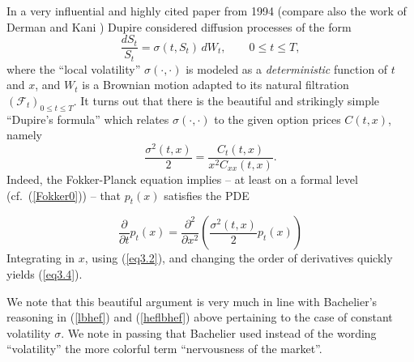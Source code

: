 \documentclass[11pt,a4paper]{article}%
\numberwithin{equation}{section}
\begin{document}
In a very influential and highly cited paper from 1994 \cite{Du94} (compare also the work of Derman and Kani \cite{DeKa94}) Dupire  considered diffusion processes of the form 
\begin{equation}\label{eq3.3}
\frac{dS_t}{S_t}=\sigma(t,S_t)\, dW_t,\qquad 0\le t \le T,
\end{equation}
where the ``local volatility'' $\sigma(\cdot,\cdot)$ is modeled as a {\it deterministic} function  of $t$ and $x$, and $W_t$ is a Brownian motion adapted to its natural filtration $(\mathcal F_t)_{0 \le t \le T }$. It turns out that there is the beautiful and strikingly simple ``Dupire's formula'' which relates $\sigma(\cdot,\cdot)$ to the given option prices $C(t,x)$, namely
\begin{equation}\label{eq3.4}
 \frac{\sigma^2(t,x)}{2} = \frac{C_t(t,x)}{x^2 C_{xx}(t,x)} .
\end{equation}
Indeed, the Fokker-Planck equation implies -- at least on a formal level (cf.\ (\ref{Fokker0})) -- that $p_t(x)$ satisfies the PDE

\begin{equation}\label{Fokker}
\frac{\partial}{\partial t}p_t(x) = \frac{\partial^2}{\partial x^2}\left(\frac{\sigma^2(t,x)}{2}p_t(x)\right)
\end{equation}
Integrating in $x$, using (\ref{eq3.2}), and changing the order of derivatives quickly yields (\ref{eq3.4}).

We note that this beautiful argument is very much in line with Bachelier's reasoning in (\ref{lbhef}) and (\ref{heflbhef}) above pertaining to the case of constant volatility $\sigma$. We note in passing that Bachelier used instead of the wording ``volatility'' the more colorful term ``nervousness of the market''. 

\vspace{1em}


\end{document}
